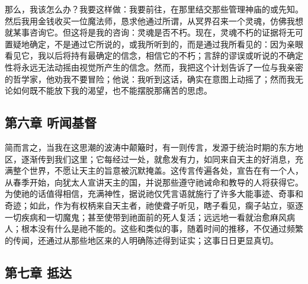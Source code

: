 那么，我该怎么办？我要这样做：我要前往，在那里结交那些管理神庙的或先知。然后我用金钱收买一位魔法师，恳求他通过所谓，从冥界召来一个灵魂，仿佛我想就某事咨询它。但这将是我的咨询：灵魂是否不朽。现在，灵魂不朽的证据将无可置疑地确定，不是通过它所说的，或我所听到的，而是通过我所看见的：因为亲眼看见它，我以后将持有最确定的信念，相信它的不朽；言辞的谬误或听说的不确定性将永远无法动摇由视觉所产生的信念。然而，我把这个计划告诉了一位与我亲密的哲学家，他劝我不要冒险；他说：我听到这话，确实在意图上动摇了；然而我无论如何既不能放下我的渴望，也不能摆脱那痛苦的思虑。\par


\subsection{第六章 听闻基督}

简而言之，当我在这思潮的波涛中颠簸时，有一则传言，发源于统治时期的东方地区，逐渐传到我们这里；它每经过一处，就愈发有力，如同来自天主的好消息，充满整个世界，不愿让天主的旨意被沉默掩盖。这传言传遍各处，宣告在有一个人，从春季开始，向犹太人宣讲天主的国，并说那些遵守祂诫命和教导的人将获得它。为使祂的话值得相信，充满神性，据说祂仅凭言语就施行了许多大能事迹、奇事和奇迹；如此，作为有权柄来自天主者，祂使聋子听见，瞎子看见，瘸子站立，驱逐一切疾病和一切魔鬼；甚至使带到祂面前的死人复活；远远地一看就治愈麻风病人；根本没有什么是祂不能的。这些和类似的事，随着时间的推移，不仅通过频繁的传闻，还通过从那些地区来的人明确陈述得到证实；这事日日更显真切。\par


\subsection{第七章 抵达}

